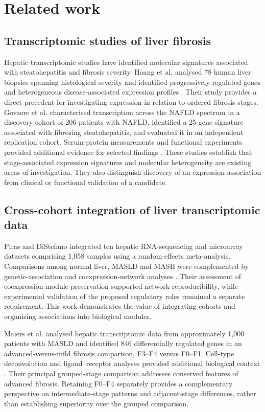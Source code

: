 \section*{Related work}
\subsection*{Transcriptomic studies of liver fibrosis}
Hepatic transcriptomic studies have identified molecular signatures associated with steatohepatitis and fibrosis severity. Hoang et al. analysed 78 human liver biopsies spanning histological severity and identified progressively regulated genes and heterogeneous disease-associated expression profiles \cite{ref4}. Their study provides a direct precedent for investigating expression in relation to ordered fibrosis stages. Govaere et al. characterised transcription across the NAFLD spectrum in a discovery cohort of 206 patients with NAFLD, identified a 25-gene signature associated with fibrosing steatohepatitis, and evaluated it in an independent replication cohort. Serum-protein measurements and functional experiments provided additional evidence for selected findings \cite{govaere2020}. These studies establish that stage-associated expression signatures and molecular heterogeneity are existing areas of investigation. They also distinguish discovery of an expression association from clinical or functional validation of a candidate.

\subsection*{Cross-cohort integration of liver transcriptomic data}
Piras and DiStefano integrated ten hepatic RNA-sequencing and microarray datasets comprising 1,058 samples using a random-effects meta-analysis. Comparisons among normal liver, MASLD and MASH were complemented by genetic-association and coexpression-network analyses \cite{piras2024}. Their assessment of coexpression-module preservation supported network reproducibility, while experimental validation of the proposed regulatory roles remained a separate requirement. This work demonstrates the value of integrating cohorts and organising associations into biological modules.

Maiers et al. analysed hepatic transcriptomic data from approximately 1,000 patients with MASLD and identified 846 differentially regulated genes in an advanced-versus-mild fibrosis comparison, F3--F4 versus F0--F1. Cell-type deconvolution and ligand--receptor analyses provided additional biological context \cite{maiers2026}. Their principal grouped-stage comparison addresses conserved features of advanced fibrosis. Retaining F0--F4 separately provides a complementary perspective on intermediate-stage patterns and adjacent-stage differences, rather than establishing superiority over the grouped comparison.

